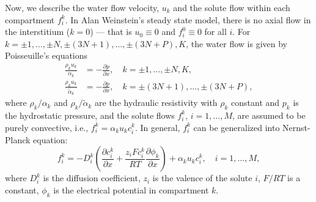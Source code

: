 \documentclass{article}
\begin{document}
Now, we describe the water flow velocity, $u_k$ and the solute flow within each compartment $f_i^k$.
In Alan Weinstein's steady state model, there is no axial flow in the interstitium ($k=0$) --- that is $u_0\equiv 0$ and $f_i^0\equiv 0$ for all $i$.
For $k=\pm 1,\dots,\pm N,\pm(3N+1),\dots,\pm(3N+P),K$, 
the water flow is given by Poisseuille's equations
\begin{align}
    \frac{\rho_ku_k}{\alpha_k} &= -\frac{\partial p}{\partial x},\quad k=\pm 1,\dots,\pm N, K,\\
    \frac{\rho_ku_k}{\tilde{\alpha}_k} &= -\frac{\partial p}{\partial x},\quad k=\pm(3N+1),\dots,\pm(3N+P),
\end{align}
where $\rho_k/\alpha_k$ and $\rho_k/\tilde{\alpha}_k$ are the hydraulic resistivity with $\rho_k$ constant and $p_k$ is the hydrostatic pressure, and the solute flows $f_i^k$, $i=1,\dots,M$, are assumed to be purely convective, i.e., $f_i^k = \alpha_ku_kc_i^k$.
In general, $f_i^k$ can be generalized into Nernst-Planck equation:
\begin{equation}
    f_i^k = -D_i^k\left( \frac{\partial c_i^k}{\partial x}+\frac{z_iFc_i^k}{RT} \frac{\partial\phi_k}{\partial x}\right) + \alpha_k u_kc_i^k,\quad i=1,\dots,M,
\end{equation}
where $D_i^k$ is the diffusion coefficient, $z_i$ is the valence of the solute $i$, $F/RT$ is a constant, $\phi_k$ is the electrical potential in compartment $k$.
\end{document}
